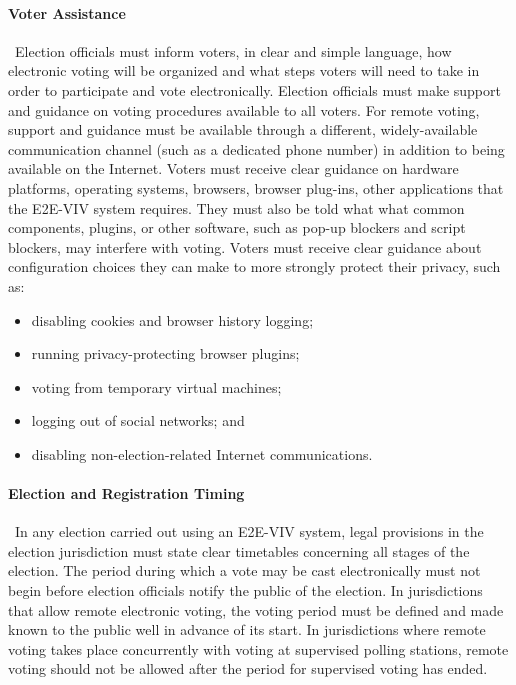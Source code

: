 \paragraph{Voter Assistance} \ Election officials must inform voters,
in clear and simple language, how electronic voting will be organized
and what steps voters will need to take in order to participate and
vote electronically. Election officials must make support and guidance
on voting procedures available to all voters. For remote voting,
support and guidance must be available through a different,
widely-available communication channel (such as a dedicated phone
number) in addition to being available on the Internet. Voters must
receive clear guidance on hardware platforms, operating systems,
browsers, browser plug-ins, other applications that the E2E-VIV system
requires. They must also be told what what common components, plugins,
or other software, such as pop-up blockers and script blockers, may
interfere with voting. Voters must receive clear guidance about
configuration choices they can make to more strongly protect their
privacy, such as:

\begin{itemize}
\item disabling cookies and browser history logging;
\item running privacy-protecting browser plugins;
\item  voting from temporary virtual machines;
\item  logging out of social networks; and
\item disabling non-election-related Internet communications.
\end{itemize}

\paragraph{Election and Registration Timing} \ In any election carried
out using an E2E-VIV system, legal provisions in the election
jurisdiction must state clear timetables concerning all stages of the
election. The period during which a vote may be cast electronically
must not begin before election officials notify the public of the
election. In jurisdictions that allow remote electronic voting, the
voting period must be defined and made known to the public well in
advance of its start. In jurisdictions where remote voting takes place
concurrently with voting at supervised polling stations, remote voting
should not be allowed after the period for supervised voting has
ended.

